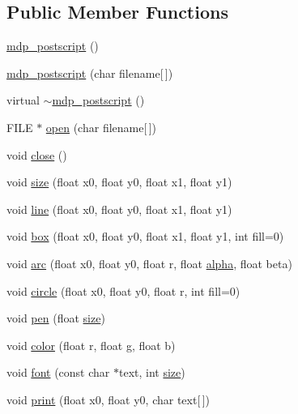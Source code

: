 \subsection*{Public Member Functions}
\begin{DoxyCompactItemize}
\item 
\hyperlink{classmdp__postscript_a30a69ecea648f202d533b02c8f21f119}{mdp\+\_\+postscript} ()
\item 
\hyperlink{classmdp__postscript_a94b381b18ec3bce5ab2ac9f0f33dcb53}{mdp\+\_\+postscript} (char filename\mbox{[}$\,$\mbox{]})
\item 
virtual \hyperlink{classmdp__postscript_a3a46d2757dc2954f970987cb3bea2784}{$\sim$mdp\+\_\+postscript} ()
\item 
F\+I\+LE $\ast$ \hyperlink{classmdp__postscript_a2c2ab911f52c386532b769dda793dcdc}{open} (char filename\mbox{[}$\,$\mbox{]})
\item 
void \hyperlink{classmdp__postscript_af41a3aa09549d5acb2b5e9a098f69089}{close} ()
\item 
void \hyperlink{classmdp__postscript_af62e32c26c084b83e1a6c318767f2192}{size} (float x0, float y0, float x1, float y1)
\item 
void \hyperlink{classmdp__postscript_a99a00f3641062e5beef501f07baa7785}{line} (float x0, float y0, float x1, float y1)
\item 
void \hyperlink{classmdp__postscript_aa44192cb071b678edb48adb39053a396}{box} (float x0, float y0, float x1, float y1, int fill=0)
\item 
void \hyperlink{classmdp__postscript_a56092f2141d3d1b0cc4afd333bed5e1e}{arc} (float x0, float y0, float r, float \hyperlink{classmdp__postscript_aca4cc1e7bee7fa702c643bdb1c69d6d0}{alpha}, float beta)
\item 
void \hyperlink{classmdp__postscript_abfa4c3e6cfd19b2ddb190ca9a5f2df02}{circle} (float x0, float y0, float r, int fill=0)
\item 
void \hyperlink{classmdp__postscript_a416d831d67bb6db2512f3e819eee8bf3}{pen} (float \hyperlink{classmdp__postscript_af62e32c26c084b83e1a6c318767f2192}{size})
\item 
void \hyperlink{classmdp__postscript_ae4c5ce5c229ad7cfef67a689c77acac3}{color} (float r, float g, float b)
\item 
void \hyperlink{classmdp__postscript_a296dff78ebec7c38e3c39d97d3743172}{font} (const char $\ast$text, int \hyperlink{classmdp__postscript_af62e32c26c084b83e1a6c318767f2192}{size})
\item 
void \hyperlink{classmdp__postscript_a0c67b14a365475f3b5b04d3d033cc4c4}{print} (float x0, float y0, char text\mbox{[}$\,$\mbox{]})
\end{DoxyCompactItemize}
